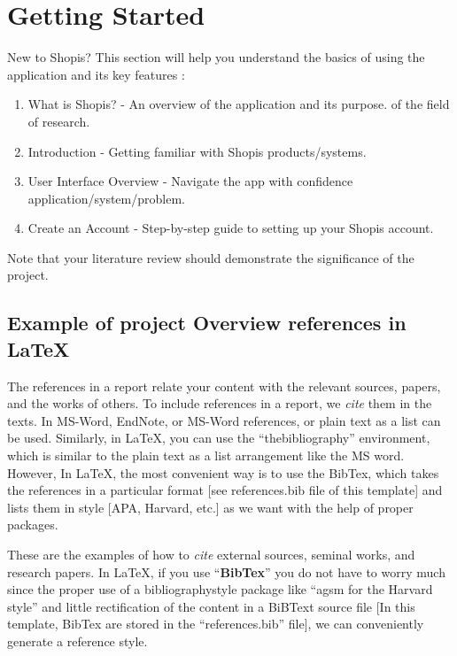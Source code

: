 \chapter{Getting Started}
\label{ch:lit_rev} %

New to Shopis? This section will help you understand the basics of using the application and its key features :
\begin{enumerate}
    \item What is Shopis? - An overview of the application and its purpose. of the field of research.
    \item Introduction - Getting familiar with Shopis products/systems.
    \item User Interface Overview - Navigate the app with confidence application/system/problem.
    \item Create an Account - Step-by-step guide to setting up your Shopis account.
\end{enumerate}
Note that your literature review should demonstrate the significance of the project.

\section{Example of project Overview references in \LaTeX} 
The references in a report relate your content with the relevant sources, papers, and the works of others. To include references in a report, we \textit{cite} them in the texts. In MS-Word, EndNote, or MS-Word references, or plain text as a list can be used. Similarly, in \LaTeX, you can use the ``thebibliography'' environment, which is similar to the plain text as a list arrangement like the MS word. However, In \LaTeX, the most convenient way is to use the BibTex, which takes the references in a particular format [see references.bib file of this template] and lists them in style [APA, Harvard, etc.] as we want with the help of proper packages.    

These are the examples of how to \textit{cite} external sources, seminal works, and research papers. In \LaTeX, if you use ``\textbf{BibTex}'' you do not have to worry much since the proper use of a bibliographystyle package like ``agsm for the Harvard style'' and little rectification of the content in a BiBText source file [In this template, BibTex are stored in the ``references.bib'' file], we can conveniently generate  a reference style. 

